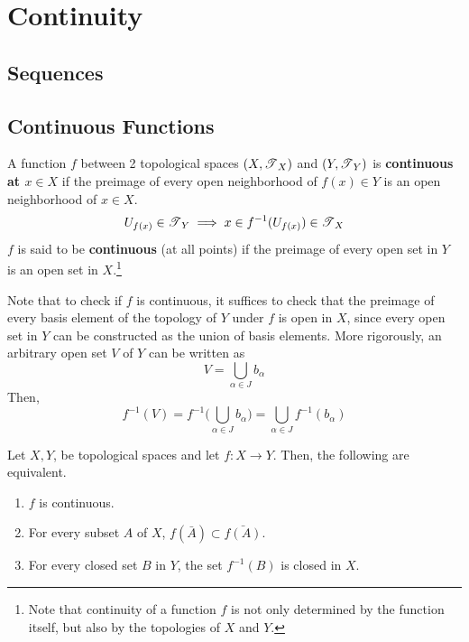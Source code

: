 \section{Continuity} 

  \subsection{Sequences}

  \subsection{Continuous Functions}

    \begin{definition}
      A function $f$ between 2 topological spaces $(X, \T_{X})$ and $(Y, \T_{Y})$ is \textbf{continuous at $x \in X$} if the preimage of every open neighborhood of $f(x) \in Y$ is an open neighborhood of $x \in X$.
      \begin{equation}
        U_{f(x)} \in \T_{Y} \implies x \in f^{-1}(U_{f(x)}) \in \T_{X}
      \end{equation} 
      $f$ is said to be \textbf{continuous} (at all points) if the preimage of every open set in $Y$ is an open set in $X$.\footnote{Note that continuity of a function $f$ is not only determined by the function itself, but also by the topologies of $X$ and $Y$.}
    \end{definition}

    Note that to check if $f$ is continuous, it suffices to check that the preimage of every basis element of the topology of $Y$ under $f$ is open in $X$, since every open set in $Y$ can be constructed as the union of basis elements. More rigorously, an arbitrary open set $V$ of $Y$ can be written as 
    \begin{equation}
      V = \bigcup_{\alpha \in J} b_\alpha
    \end{equation}
    Then, 
    \begin{equation}
      f^{-1} (V) = f^{-1} \Big( \bigcup_{\alpha \in J} b_\alpha \Big) = \bigcup_{\alpha \in J} f^{-1} (b_\alpha)
    \end{equation}

    \begin{theorem}
      Let $X, Y$, be topological spaces and let $f: X \longrightarrow Y$. Then, the following are equivalent. 
      \begin{enumerate}
        \item $f$ is continuous. 
        \item For every subset $A$ of $X$, $f(\bar{A}) \subset \bar{f(A)}$. 
        \item For every closed set $B$ in $Y$, the set $f^{-1} (B)$ is closed in $X$. 
      \end{enumerate}
    \end{theorem}  

